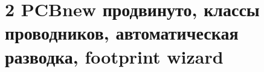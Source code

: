 \chapter{2 PCBnew продвинуто, классы проводников, автоматическая разводка, footprint wizard}\label{kicad:pcbnew-adv}

